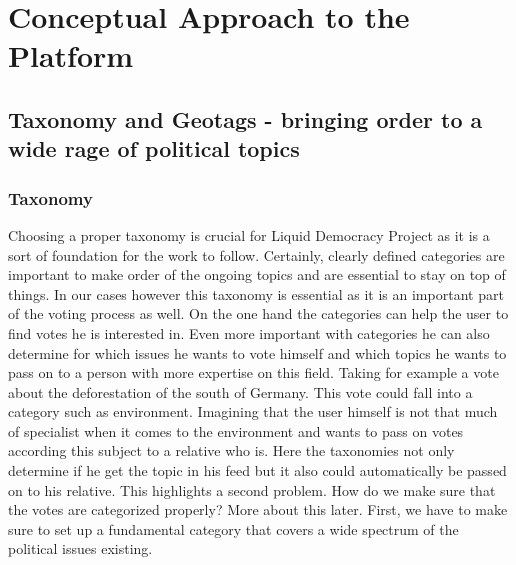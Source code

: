 


\section{Conceptual Approach to the Platform}
\label{sec:Conceptual_Approach}
\subsection{Taxonomy and Geotags - bringing order to a wide rage of political topics}
\label{sec:Model_Contexts}
\subsubsection{Taxonomy}
Choosing a proper taxonomy is crucial for Liquid Democracy Project as it is a sort of foundation for the work to follow. Certainly, clearly defined categories are important to make order of the ongoing topics and are essential to stay on top of things. In our cases however this taxonomy is essential as it is an important part of the voting process as well. On the one hand the categories can help the user to find votes he is interested in. Even more important with categories he can also determine for which issues he wants to vote himself and which topics he wants to pass on to a person with more expertise on this field. Taking for example a vote about the deforestation of the south of Germany. This vote could fall into a category such as environment. Imagining that the user himself is not that much of specialist when it comes to the environment and wants to pass on votes according this subject to a relative who is. Here the taxonomies not only determine if he get the topic in his feed but it also could automatically be passed on to his relative. This highlights a second problem. How do we make sure that the votes are categorized properly? More about this later. First, we have to make sure to set up a fundamental category that covers a wide spectrum of the political issues existing.

